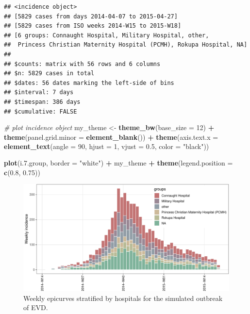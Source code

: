 \documentclass[9pt,a4paper]{extarticle}
\newenvironment{Shaded}{\begin{snugshade}}{\end{snugshade}}
\newcommand{\CommentTok}[1]{\textcolor[rgb]{0.56,0.35,0.01}{\textit{#1}}}
\newcommand{\DataTypeTok}[1]{\textcolor[rgb]{0.13,0.29,0.53}{#1}}
\newcommand{\DecValTok}[1]{\textcolor[rgb]{0.00,0.00,0.81}{#1}}
\newcommand{\FloatTok}[1]{\textcolor[rgb]{0.00,0.00,0.81}{#1}}
\newcommand{\KeywordTok}[1]{\textcolor[rgb]{0.13,0.29,0.53}{\textbf{#1}}}
\newcommand{\NormalTok}[1]{#1}
\newcommand{\OperatorTok}[1]{\textcolor[rgb]{0.81,0.36,0.00}{\textbf{#1}}}
\newcommand{\StringTok}[1]{\textcolor[rgb]{0.31,0.60,0.02}{#1}}
\begin{document}
\begin{verbatim}
## <incidence object>
## [5829 cases from days 2014-04-07 to 2015-04-27]
## [5829 cases from ISO weeks 2014-W15 to 2015-W18]
## [6 groups: Connaught Hospital, Military Hospital, other, 
##  Princess Christian Maternity Hospital (PCMH), Rokupa Hospital, NA]
## 
## $counts: matrix with 56 rows and 6 columns
## $n: 5829 cases in total
## $dates: 56 dates marking the left-side of bins
## $interval: 7 days
## $timespan: 386 days
## $cumulative: FALSE
\end{verbatim}



\begin{Shaded}
\begin{Highlighting}[]
\CommentTok{# plot incidence object}
\NormalTok{my_theme <-}\StringTok{ }\KeywordTok{theme_bw}\NormalTok{(}\DataTypeTok{base_size =} \DecValTok{12}\NormalTok{) }\OperatorTok{+}
\StringTok{  }\KeywordTok{theme}\NormalTok{(}\DataTypeTok{panel.grid.minor =} \KeywordTok{element_blank}\NormalTok{()) }\OperatorTok{+}
\StringTok{  }\KeywordTok{theme}\NormalTok{(}\DataTypeTok{axis.text.x =} \KeywordTok{element_text}\NormalTok{(}\DataTypeTok{angle =} \DecValTok{90}\NormalTok{, }\DataTypeTok{hjust =} \DecValTok{1}\NormalTok{, }\DataTypeTok{vjust =} \FloatTok{0.5}\NormalTok{, }\DataTypeTok{color =} \StringTok{"black"}\NormalTok{))}

\KeywordTok{plot}\NormalTok{(i.7.group, }\DataTypeTok{border =} \StringTok{"white"}\NormalTok{) }\OperatorTok{+}\StringTok{ }
\StringTok{  }\NormalTok{my_theme }\OperatorTok{+}\StringTok{ }
\StringTok{  }\KeywordTok{theme}\NormalTok{(}\DataTypeTok{legend.position =} \KeywordTok{c}\NormalTok{(}\FloatTok{0.8}\NormalTok{, }\FloatTok{0.75}\NormalTok{))}
\end{Highlighting}
\end{Shaded}


\begin{figure}[h!]
\centering
	\includegraphics[width=\textwidth]{figures/incidence-curve-1.pdf}
	\caption{\label{fig:incidence-curve}Weekly epicurves stratified by hospitals for the
simulated outbreak of EVD.}
\end{figure}
\end{document}
